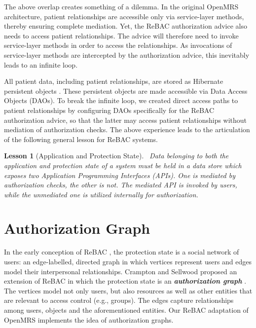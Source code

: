 \documentclass{acm_proc_article-sp}
\newcommand{\Dfn}[1]{\textbf{\emph{#1}}}
\newtheorem{lesson}{Lesson}
\begin{document}
The above overlap creates something of a dilemma.  In the original
OpenMRS architecture, patient relationships are accessible only via
service-layer methods, thereby ensuring complete mediation.  Yet, the
ReBAC authorization advice also needs to access patient relationships.
The advice will therefore need to invoke service-layer methods in
order to access the relationships.  As invocations of service-layer
methods are intercepted by the authorization advice, this
inevitably leads to an infinite loop.

All patient data, including patient relationships, are stored as
Hibernate persistent objects \cite{Hibernate}.  These persistent
objects are made accessible via Data Access Objects (DAOs).  To break
the infinite loop, we created direct access paths to patient
relationships by configuring DAOs specifically for the ReBAC
authorization advice, so that the latter may access patient
relationships without mediation of authorization checks.  The above
experience leads to the articulation of the following general lesson
for ReBAC systems.
\begin{lesson}[Application and Protection State] \ \linebreak Data
  belonging to both the application and protection state of a system
  must be held in a data store which exposes two Application
  Programming Interfaces (APIs).  One is mediated by authorization
  checks, the other is not.  The mediated API is invoked by users,
  while the unmediated one is utilized internally for authorization.
\end{lesson}


\section{Authorization Graph}
\label{sec-auth-graph}

In the early conception of ReBAC \cite{Bruns-etal:2012}, the
protection state is a social network of users: an edge-labelled,
directed graph in which vertices represent users and edges model their
interpersonal relationships.  Crampton and Sellwood proposed an
extension of ReBAC in which the protection state is an
\Dfn{authorization graph} \cite{Crampton-Sellwood:2014}. The vertices
model not only users, but also resources as well as other entities
that are relevant to access control (e.g., groups).  The edges capture
relationships among users, objects and the aforementioned entities.
Our ReBAC adaptation of OpenMRS implements the idea of authorization
graphs.
\end{document}
